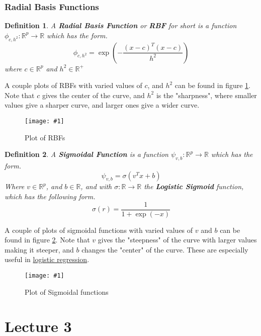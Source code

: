\documentclass[letterpaper, 12pt]{article}
\def\figinsert#1#2#3{
    \begin{figure}[ht]
    \centering
    \texttt{[image: \#1]}
    \caption{#2}
    \label{#3}
    \end{figure}%
}
\newcommand{\R}{\mathbb{R}}	%
\newcommand{\1}{\mathds{1}}	%
\newtheorem{definition}{Definition}[section]
\begin{document}
\subsubsection{Radial Basis Functions}
\begin{definition}
    A \textbf{Radial Basis Function} or \textbf{RBF} for short is a function \(\phi_{c,h^2}:\R^p \to \R\) which has the form.
    \begin{equation*}
        \phi_{c,h^2} = \exp\left(-\frac{(x-c)^T (x-c)}{h^2}\right)
    \end{equation*}
    where \(c\in\R^p\) and \(h^2 \in \R^{+}\)
\end{definition}
A couple plots of RBFs with varied values of \(c\), and \(h^2\) can be found in figure \ref{fig: rbf plot}. Note that \(c\) gives the center of the curve, and \(h^2\) is the "sharpness", where smaller values give a sharper curve, and larger ones give a wider curve.
\figinsert{python/lecture2/rbf/rbfplot.eps}{Plot of RBFs}{fig: rbf plot}

\begin{definition}
    A \textbf{Sigmoidal Function} is a function \(\psi_{v,b}:\R^p \to \R\) which has the form.
    \begin{equation*}
        \psi_{v,b} = \sigma(v^Tx + b )
    \end{equation*}
    Where \(v\in\R^p\), and \(b\in\R\), and with \(\sigma :\R \to \R\) the \textbf{Logistic Sigmoid} function, which has the following form.
    \begin{equation*}
        \sigma(r) = \frac{1}{1+\exp(-x)}
    \end{equation*}
\end{definition}
A couple of plots of sigmoidal functions with varied values of \(v\) and \(b\) can be found in figure \ref{fig: sigmoid plot}. Note that \(v\) gives the "steepness" of the curve with larger values making it steeper, and \(b\) changes the "center" of the curve. These are especially useful in \href{https://en.wikipedia.org/wiki/Logistic_regression}{logistic regression}.
\figinsert{python/lecture2/sigmoid/sigmoidplot.eps}{Plot of Sigmoidal functions}{fig: sigmoid plot}
\section{Lecture 3}
\end{document}
